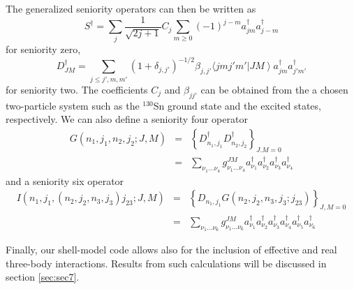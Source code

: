\documentclass{article}
\begin{document}
The generalized seniority operators \cite{talmi} can then be written as 
\begin{equation}
    S^{\dagger}= \sum_{j}
    \frac{1}{\sqrt{2j+1}}C_{j}\sum_{m \geq 0} (-1)^{j-m} a^{\dagger}_{jm}
    a_{j-m}^{\dagger}
    \label{eq:zerosen}
\end{equation}
for seniority zero,
\begin{equation}
     D_{J M}^{\dagger}
         = \sum_{j \leq j', m,m'} (1+\delta_{j,j'})^{-1/2}
           \beta_{j,j'} \langle j m j' m'
           \left | J M \right \rangle a^{\dagger}_{jm}a^{\dagger}_{j' m'}
\label{eq:twosen}
\end{equation}
for seniority two. The coefficients $C_{j}$ and $\beta_{jj'}$ can be  obtained from the a chosen 
two-particle system such as the $^{130}$Sn
ground state and the excited states, respectively.
We can also define a
seniority four operator
\begin{eqnarray}
G(n_1,j_1, n_2,j_2; J,M)
      &=& \left \{D_{n_1,j_1}^{\dagger} D_{n_2,j_2}^{\dagger}
               \right \}_{J.M = 0}  \nonumber\\
      &=& \sum_{\nu_1 \ldots \nu_4} g_{\nu_1 \ldots \nu_4}^{JM}
           a_{\nu_1}^{\dagger}a_{\nu_2}^{\dagger}a_{\nu_3}^{\dagger}
                        a_{\nu_4}^{\dagger} 
%
  \end{eqnarray}
%
and  a seniority six operator
%
\begin{eqnarray}
I(n_1,j_1,(n_2,j_2,n_3,j_3)j_{23}; J,M)
        &=& \left \{ D_{n_1,j_1} G(n_2,j_2, n_3,j_3; j_{23})
              \right \}_{J,M = 0} \nonumber\\
        &=& \sum_{\nu_1 \ldots \nu_6} g_{\nu_1 \dots \nu_6}^{JM}
           a_{\nu_1}^{\dagger}a_{\nu_2}^{\dagger}a_{\nu_3}^{\dagger}
           a_{\nu_4}^{\dagger} a_{\nu_5}^{\dagger} a_{\nu_6}^{\dagger}
%
\end{eqnarray}

Finally, our shell-model code allows also for the inclusion
of effective and real three-body interactions. Results from such calculations
will be discussed in section \ref{sec:sec7}.
\end{document}
